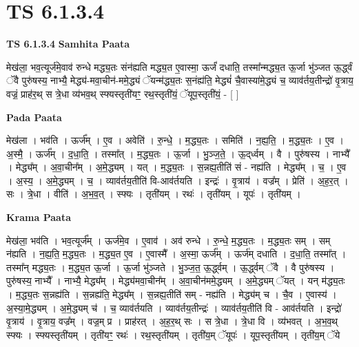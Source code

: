 \documentclass[17pt]{extarticle}
\begin{document}
\section{ TS 6.1.3.4 }

\textbf{TS 6.1.3.4 } \newline
\textbf{Samhita Paata} \newline

मेख॑ला॒ भव॒त्यूर्ज॑मे॒वाव॑ रुन्धे मद्ध्य॒तः संन॑ह्यति मद्ध्य॒त ए॒वास्मा॒ ऊर्जं॑ दधाति॒ तस्मा᳚न्मद्ध्य॒त ऊ॒र्जा भु॑ञ्जत ऊ॒र्द्ध्वं ॅवै पुरु॑षस्य॒ नाभ्यै॒ मेद्ध्य॑-मवा॒चीन॑-ममे॒द्ध्यं ॅयन्म॑द्ध्य॒तः स॒नंह्य॑ति॒ मेद्ध्यं॑ चै॒वास्या॑मे॒द्ध्यं च॒ व्याव॑र्तय॒तीन्द्रो॑ वृ॒त्राय॒ वज्रं॒ प्राह॑र॒थ् स त्रे॒धा व्य॑भव॒थ् स्फ्यस्तृती॑यꣳ॒॒ रथ॒स्तृती॑यं॒ ॅयूप॒स्तृती॑यं॒ - [  ] \newline

\textbf{Pada Paata} \newline

मेख॑ला । भव॑ति । ऊर्ज᳚म् । ए॒व । अवेति॑ । रु॒न्धे॒ । म॒द्ध्य॒तः । समिति॑ । न॒ह्य॒ति॒ । म॒द्ध्य॒तः । ए॒व । अ॒स्मै॒ । ऊर्ज᳚म् । द॒धा॒ति॒ । तस्मा᳚त् । म॒द्ध्य॒तः । ऊ॒र्जा । भु॒ञ्ज॒ते॒ । ऊ॒द्‌र्ध्वम् । वै । पुरु॑षस्य । नाभ्यै᳚ । मेद्ध्य᳚म् । अ॒वा॒चीन᳚म् । अ॒मे॒द्ध्यम् । यत् । म॒द्ध्य॒तः । स॒न्नह्य॒तीति॑ सं - नह्य॑ति । मेद्ध्य᳚म् । च॒ । ए॒व । अ॒स्य॒ । अ॒मे॒द्ध्यम् । च॒ । व्याव॑र्तय॒तीति॑ वि-आव॑र्तयति । इन्द्रः॑ । वृ॒त्राय॑ । वज्र᳚म् । प्रेति॑ । अ॒ह॒र॒त् । सः । त्रे॒धा । वीति॑ । अ॒भ॒व॒त् । स्फ्यः । तृती॑यम् । रथः॑ । तृती॑यम् । यूपः॑ । तृती॑यम् ।  \newline


\textbf{Krama Paata} \newline

मेख॑ला॒ भव॑ति । भव॒त्यूर्ज᳚म् । ऊर्ज॑मे॒व । ए॒वाव॑ । अव॑ रुन्धे । रु॒न्धे॒ म॒द्ध्य॒तः । म॒द्ध्य॒तः सम् । सम् न॑ह्यति । न॒ह्य॒ति॒ म॒द्ध्य॒तः । म॒द्ध्य॒त ए॒व । ए॒वास्मै᳚ । अ॒स्मा॒ ऊर्ज᳚म् । ऊर्ज॑म् दधाति । द॒धा॒ति॒ तस्मा᳚त् । तस्मा᳚न् मद्ध्य॒तः । म॒द्ध्य॒त ऊ॒र्जा । ऊ॒र्जा भु॑ञ्जते । भु॒ञ्ज॒त॒ ऊ॒र्द्ध्वम् । ऊ॒र्द्ध्वम् ॅवै । वै पुरु॑षस्य । पुरु॑षस्य॒ नाभ्यै᳚ । नाभ्यै॒ मेद्ध्य᳚म् । मेद्ध्य॑मवा॒चीन᳚म् । अ॒वा॒चीन॑ममे॒द्ध्यम् । अ॒मे॒द्ध्यम् ॅयत् । यन् म॑द्ध्य॒तः । म॒द्ध्य॒तः स॒न्नह्य॑ति । स॒न्नह्य॑ति॒ मेद्ध्य᳚म् । स॒न्नह्य॒तीति॑ सम् - नह्य॑ति । मेद्ध्य॑म् च । चै॒व । ए॒वास्य॑ । अ॒स्या॒मे॒द्ध्यम् । अ॒मे॒द्ध्यम् च॑ । च॒ व्याव॑र्तयति । व्याव॑र्तय॒तीन्द्रः॑ । व्याव॑र्तय॒तीति॑ वि - आव॑र्तयति । इन्द्रो॑ वृ॒त्राय॑ । वृ॒त्राय॒ वज्र᳚म् । वज्र॒म् प्र । प्राह॑रत् । अ॒ह॒र॒थ् सः । स त्रे॒धा । त्रे॒धा वि । व्य॑भवत् । अ॒भ॒व॒थ् स्फ्यः । स्फ्यस्तृती॑यम् । तृती॑यꣳ॒॒ रथः॑ । रथ॒स्तृती॑यम् । तृती॑य॒म् ॅयूपः॑ । यूप॒स्तृती॑यम् । तृती॑य॒म् ॅये \newline
\end{document}
